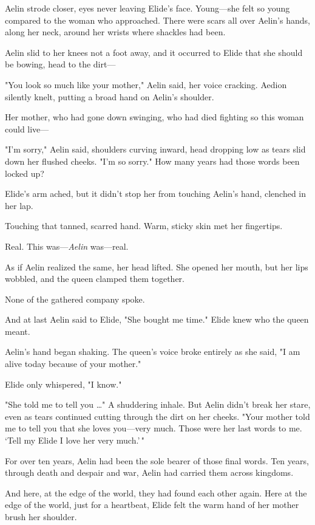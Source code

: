 Aelin strode closer, eyes never leaving Elide's face. Young---she felt so young compared to the woman who approached. There were scars all over Aelin's hands, along her neck, around her wrists  where shackles had been.

Aelin slid to her knees not a foot away, and it occurred to Elide that she should be bowing, head to the dirt---

"You look  so much like your mother," Aelin said, her voice cracking. Aedion silently knelt, putting a broad hand on Aelin's shoulder.

Her mother, who had gone down swinging, who had died fighting so this woman could live---

"I'm sorry," Aelin said, shoulders curving inward, head dropping low as tears slid down her flushed cheeks. "I'm so sorry." How many years had those words been locked up?

Elide's arm ached, but it didn't stop her from touching Aelin's hand, clenched in her lap.

Touching that tanned, scarred hand. Warm, sticky skin met her fingertips.

Real. This was---\emph{Aelin} was---real.

As if Aelin realized the same, her head lifted. She opened her mouth, but her lips wobbled, and the queen clamped them together.

None of the gathered company spoke.

And at last Aelin said to Elide, "She bought me time." Elide knew who the queen meant.

Aelin's hand began shaking. The queen's voice broke entirely as she said, "I am alive today because of your mother."

Elide only whispered, "I know."

"She told me to tell you \ldots" A shuddering inhale. But Aelin didn't break her stare, even as tears continued cutting through the dirt on her cheeks. "Your mother told me to tell you that she loves you---very much. Those were her last words to me. `Tell my Elide I love her very much.'\,"

For over ten years, Aelin had been the sole bearer of those final words. Ten years, through death and despair and war, Aelin had carried them across kingdoms.

And here, at the edge of the world, they had found each other again. Here at the edge of the world, just for a heartbeat, Elide felt the warm hand of her mother brush her shoulder.

